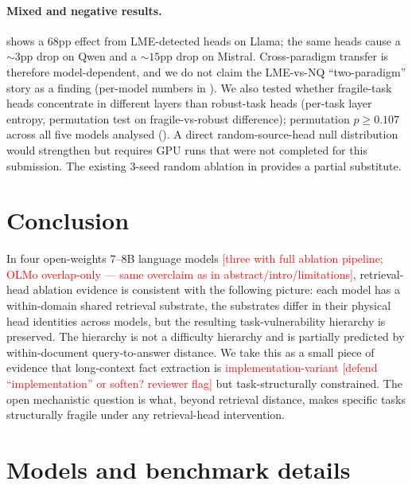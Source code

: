 \documentclass{article}
\theoremstyle{plain}
\theoremstyle{definition}
\theoremstyle{remark}
\begin{document}
\paragraph{Mixed and negative results.}  shows a $68$pp effect from LME-detected heads on Llama; the same heads cause a $\sim 3$pp drop on Qwen and a $\sim 15$pp drop on Mistral. Cross-paradigm transfer is therefore model-dependent, and we do not claim the LME-vs-NQ ``two-paradigm'' story as a finding (per-model numbers in ). We also tested whether fragile-task heads concentrate in different layers than robust-task heads (per-task layer entropy, permutation test on fragile-vs-robust difference); permutation $p \geq 0.107$ across all five models analysed (). A direct random-source-head null distribution would strengthen  but requires GPU runs that were not completed for this submission. The existing $3$-seed random ablation in  provides a partial substitute.

\section{Conclusion}

In four open-weights $7$--$8$B language models\textcolor{red}{ [three with full ablation pipeline; OLMo overlap-only --- same overclaim as in abstract/intro/limitations]}, retrieval-head ablation evidence is consistent with the following picture: each model has a within-domain shared retrieval substrate, the substrates differ in their physical head identities across models, but the resulting task-vulnerability hierarchy is preserved. The hierarchy is not a difficulty hierarchy and is partially predicted by within-document query-to-answer distance. We take this as a small piece of evidence that long-context fact extraction is \textcolor{red}{implementation-variant [defend ``implementation'' or soften? reviewer flag]} but task-structurally constrained. The open mechanistic question is what, beyond retrieval distance, makes specific tasks structurally fragile under any retrieval-head intervention.

\clearpage




\newpage
\appendix
\onecolumn

\section{Models and benchmark details}
\label{app:models}
\end{document}
